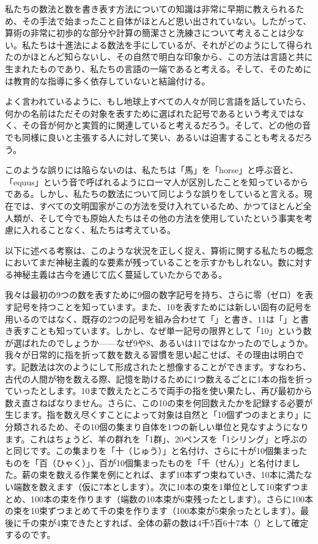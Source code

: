 \documentclass[a4paper,11pt,openany]{ltjsbook}
\begin{document}
私たちの数法と数を書き表す方法についての知識は非常に早期に教えられるため、その手法で始まったこと自体がほとんど思い出されていない。したがって、算術の非常に初歩的な部分や計算の簡潔さと洗練さについて考えることは少ない。私たちは十進法による数法を手にしているが、それがどのようにして得られたのかほとんど知らないし、その自然で明白な印象から、この方法は言語と共に生まれたものであり、私たちの言語の一端であると考える。そして、そのためには教育的な指導に多く依存していないと結論付ける。

よく言われているように、もし地球上すべての人々が同じ言語を話していたら、何かの名前はただその対象を表すために選ばれた記号であるという考えではなく、その音が何かと実質的に関連していると考えるだろう。そして、どの他の音でも同様に良いと主張する人に対して笑い、あるいは迫害することも考えるだろう。

このような誤りには陥らないのは、私たちは「馬」を「horse」と呼ぶ音と、「equus」という音で呼ばれるようにローマ人が区別したことを知っているからである。しかし、私たちの数法について同じような誤りをしていると言える。現在では、すべての文明国家がこの方法を受け入れているため、かつてほとんど全人類が、そして今でも原始人たちはその他の方法を使用していたという事実を考慮に入れることなく、私たちは考えている。

以下に述べる考察は、このような状況を正しく捉え、算術に関する私たちの概念においてまだ神秘主義的な要素が残っていることを示すかもしれない。数に対する神秘主義は古今を通じて広く蔓延していたからである。

我々は最初の9つの数を表すために9個の数字記号を持ち、さらに零（ゼロ）を表す記号を持つことを知っています。また、10を表すためには新しい固有の記号を用いるのではなく、既存の2つの記号を組み合わせて「$」と書き、11は「$」と書き表すことも知っています。しかし、なぜ単一記号の限界として「10」という数が選ばれたのでしょうか——なぜ9や8、あるいは11ではなかったのでしょうか。我々が日常的に指を折って数を数える習慣を思い起こせば、その理由は明白です。記数法は次のようにして形成されたと想像することができます。すなわち、古代の人間が物を数える際、記憶を助けるために1つ数えるごとに1本の指を折っていったとします。10まで数えたところで両手の指を使い果たし、再び最初から数え直さねばなりません。さらに、この10の束を何回数えたかを記録する必要が生じます。指を数え尽くすことによって対象は自然と「10個ずつのまとまり」に分類されるため、その10個の集まり自体を1つの新しい単位と見なすようになります。これはちょうど、羊の群れを「1群」、20ペンスを「1シリング」と呼ぶのと同じです。この集まりを「十（じゅう）」と名付け、さらに十が10個集まったものを「百（ひゃく）」、百が10個集まったものを「千（せん）」と名付けました。薪の束を数える作業を例にとれば、まず10本ずつ束ねていき、10本に満たない端数を数えます（仮に7本とします）。次に10本の束を1単位として10束ずつまとめ、100本の束を作ります（端数の10本束が6束残ったとします）。さらに100本の束を10束ずつまとめて千の束を作ります（100本束が5束余ったとします）。最後に千の束が4束できたとすれば、全体の薪の数は4千5百6十7本（）として確定するのです。
\end{document}
